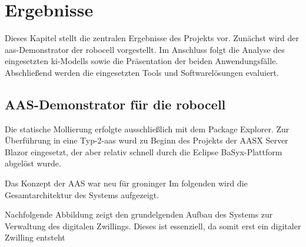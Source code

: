 \newpage
\section{Ergebnisse}
Dieses Kapitel stellt die zentralen Ergebnisse des Projekts vor. 
Zunächst wird der \acs{aas}-Demonstrator der robocell vorgestellt.
Im Anschluss folgt die Analyse des eingesetzten \acs{ki}-Modells sowie die Präsentation der beiden Anwendungsfälle. 
Abschließend werden die eingesetzten Tools und Softwarelösungen evaluiert.

    



    
\subsection{AAS-Demonstrator für die robocell}
Die statische Mollierung erfolgte ausschließlich mit dem Package Explorer.
Zur Überführung in eine Typ-2-\acs{aas} wurd zu Beginn des Projekts der AASX Server Blazor eingesetzt, der aber relativ schnell durch die Eclipse BaSyx-Plattform abgelöst wurde.

Das Konzept der AAS war neu für groninger
Im folgenden wird die Gesamtarchitektur des Systems aufgezeigt.

Nachfolgende Abbildung zeigt den grundelgenden Aufbau des Systems zur Verwaltung des digitalen Zwillings.
Dieses ist essenziell, da somit erst ein digitaler Zwilling entsteht

